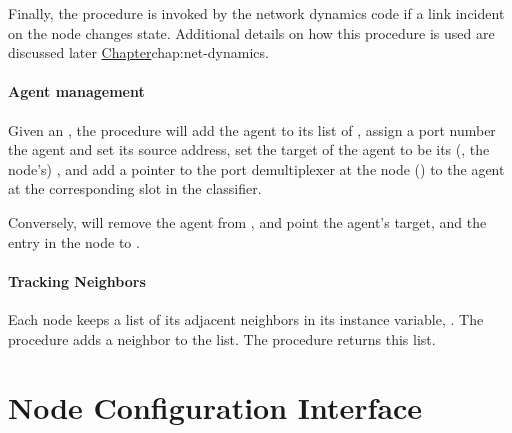 Finally, the procedure  is invoked by
the network dynamics code if a link incident on the node
changes state.  Additional details on how this procedure
is used are discussed later
\href{in the chapter on network dynamics}{Chapter}{chap:net-dynamics}.

\paragraph{Agent management}
Given an , the procedure  will
add the agent to its list of ,
assign a port number the agent and set its source address,
set the target of the agent to be its (\ie, the node's) ,
and add a pointer to the port demultiplexer at the node ()
to the agent at the corresponding slot in the  classifier.

Conversely, will remove the agent from ,
and point the agent's target, and the entry in the node 
to .

\paragraph{Tracking Neighbors}
Each node keeps a list of its adjacent neighbors in its instance variable,
.  The procedure  adds a neighbor to the list.  The procedure  returns this list.

\section{Node Configuration Interface}
\label{sec:node:nodeconfig}


